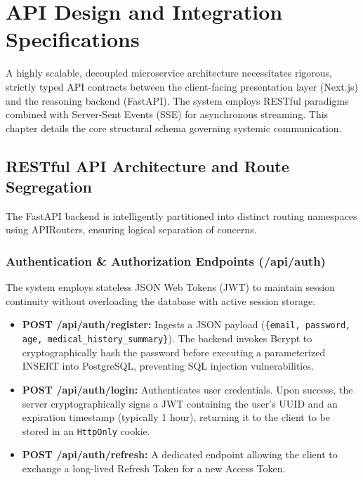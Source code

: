\documentclass[12pt]{article}
\begin{document}
\newpage
\section{API Design and Integration Specifications}

A highly scalable, decoupled microservice architecture necessitates rigorous, strictly typed API contracts between the client-facing presentation layer (Next.js) and the reasoning backend (FastAPI). The system employs RESTful paradigms combined with Server-Sent Events (SSE) for asynchronous streaming. This chapter details the core structural schema governing systemic communication.

\subsection{RESTful API Architecture and Route Segregation}
The FastAPI backend is intelligently partitioned into distinct routing namespaces using APIRouters, ensuring logical separation of concerns.

\subsubsection{Authentication \& Authorization Endpoints (/api/auth)}
The system employs stateless JSON Web Tokens (JWT) to maintain session continuity without overloading the database with active session storage.
\begin{itemize}
    \item \textbf{POST /api/auth/register:} Ingests a JSON payload (\texttt{\{email, password, age, medical\_history\_summary\}}). The backend invokes Bcrypt to cryptographically hash the password before executing a parameterized INSERT into PostgreSQL, preventing SQL injection vulnerabilities.
    \item \textbf{POST /api/auth/login:} Authenticates user credentials. Upon success, the server cryptographically signs a JWT containing the user's UUID and an expiration timestamp (typically 1 hour), returning it to the client to be stored in an \texttt{HttpOnly} cookie.
    \item \textbf{POST /api/auth/refresh:} A dedicated endpoint allowing the client to exchange a long-lived Refresh Token for a new Access Token.
\end{itemize}
\end{document}

